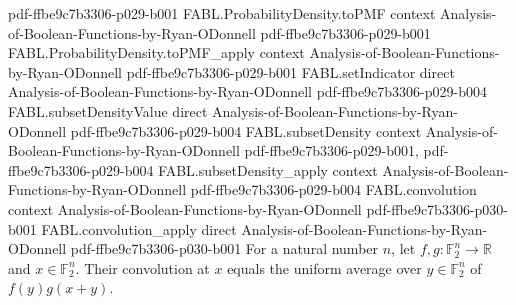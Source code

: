 \begin{theorem}
  {pdf-ffbe9c7b3306-p029-b001}
\proofstep
  {FABL.ProbabilityDensity.toPMF}
  {context}
  {Analysis-of-Boolean-Functions-by-Ryan-ODonnell}
  {pdf-ffbe9c7b3306-p029-b001}
\proofstep
  {FABL.ProbabilityDensity.toPMF_apply}
  {context}
  {Analysis-of-Boolean-Functions-by-Ryan-ODonnell}
  {pdf-ffbe9c7b3306-p029-b001}
\proofstep
  {FABL.setIndicator}
  {direct}
  {Analysis-of-Boolean-Functions-by-Ryan-ODonnell}
  {pdf-ffbe9c7b3306-p029-b004}
\proofstep
  {FABL.subsetDensityValue}
  {direct}
  {Analysis-of-Boolean-Functions-by-Ryan-ODonnell}
  {pdf-ffbe9c7b3306-p029-b004}
\proofstep
  {FABL.subsetDensity}
  {context}
  {Analysis-of-Boolean-Functions-by-Ryan-ODonnell}
  {pdf-ffbe9c7b3306-p029-b001,
    pdf-ffbe9c7b3306-p029-b004}
\proofstep
  {FABL.subsetDensity_apply}
  {context}
  {Analysis-of-Boolean-Functions-by-Ryan-ODonnell}
  {pdf-ffbe9c7b3306-p029-b004}
\proofstep
  {FABL.convolution}
  {context}
  {Analysis-of-Boolean-Functions-by-Ryan-ODonnell}
  {pdf-ffbe9c7b3306-p030-b001}
\proofstep
  {FABL.convolution_apply}
  {direct}
  {Analysis-of-Boolean-Functions-by-Ryan-ODonnell}
  {pdf-ffbe9c7b3306-p030-b001}
For a natural number $n$, let $f,g:\mathbb{F}_2^n\to\mathbb{R}$ and
$x\in\mathbb{F}_2^n$. Their convolution at $x$ equals the uniform average over
$y\in\mathbb{F}_2^n$ of $f(y)g(x+y)$.
\end{theorem}

